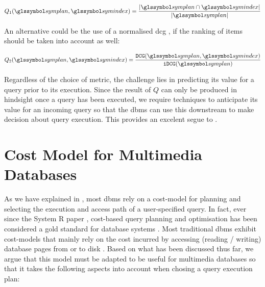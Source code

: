 \begin{equation*}
        Q_1(\symplan,\symindex) = \frac{|\symplan \cap \symindex|}{|\symplan|}
\end{equation*}

An alternative could be the use of a normalised \acrfull{dcg} \cite{Jarvelin:2002Cumulated}, if the ranking of items should be taken into account as well:

\begin{equation*}
    Q_2(\symplan,\symindex) = \frac{\mathtt{DCG}(\symplan,\symindex)}{\mathtt{iDCG}(\symplan)}
\end{equation*}

Regardless of the choice of metric, the challenge lies in predicting its value for a query prior to its execution. Since the result of $Q$ can only be produced in hindsight once a query has been executed, we require techniques to anticipate its value for an incoming query so that the \acrshort{dbms} can use this downstream to make decision about query execution. This provides an excelent segue to .

\section{Cost Model for Multimedia Databases}
\label{section:cost_model}

As we have explained in , most \acrshort{dbms} rely on a cost-model for planning and selecting the execution and access path of a user-specified query. In fact, ever since the System R paper \cite{Selinger:1979Access}, cost-based query planning and optimisation has been considered a gold standard for database systems \cite{Mannino:1988Statistical}. Most traditional \acrshort{dbms} exhibit cost-models that mainly rely on the cost incurred by accessing (reading / writing) database pages from or to disk \cite{Mannino:1988Statistical,Garcia:2009Database,Petrov:2019Database}. Based on what has been discussed thus far, we argue that this model must be adapted to be useful for multimedia databases so that it takes the following aspects into account when chosing a query execution plan:

